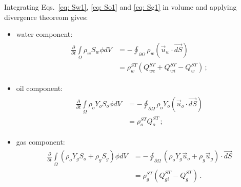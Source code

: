 \documentclass[final,authoryear,5p,times,twocolumn,10pt]{elsarticle}
\begin{document}
Integrating Eqs.~\eqref{eq: Sw1}, \eqref{eq: So1} and \eqref{eq: Sg1} in volume and applying divergence theoreom gives:
\begin{itemize}
\item water component:
\begin{align}\label{eq: Sw2}
\begin{split}
\frac{\partial}{\partial t} \int\limits_{\Omega} \rho_w S_w \phi dV &= - \oint_{\partial \Omega} \rho_w \left( \vec{u}_w \cdot \vec{dS} \right) \\
&= \rho_w^{ST}\left(Q_{we}^{ST} + Q_{wi}^{ST}-Q_w^{ST}\right) \, ;
\end{split}
\end{align}

\item oil component:
\begin{align}\label{eq: So2}
\begin{split}
\frac{\partial}{\partial t} \int\limits_{\Omega} \rho_o Y_o S_o \phi dV &= -\oint_{\partial \Omega} \rho_o Y_o \left(\vec{u}_o \cdot \vec{dS} \right) \\
&= \rho_o^{ST}Q_o^{ST} \, ;
\end{split}
\end{align}

\item gas component:
\begin{align}\label{eq: Sg2}
\begin{split}
\frac{\partial}{\partial t} \int\limits_{\Omega} \left( \rho_o Y_g S_o + \rho_g S_g\right) \phi dV &= - \oint_{\partial \Omega} \left( \rho_o Y_g \vec{u}_o + \rho_g \vec{u}_g\right) \cdot \vec{dS} \\
&=  \rho_g^{ST}(Q_{gi}^{ST}-Q_g^{ST}) \, .
\end{split}
\end{align}
\end{itemize}
%
%
%
%
\end{document}
